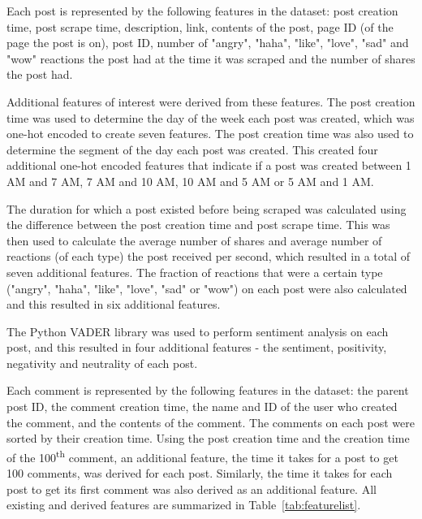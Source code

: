 \documentclass[twoside]{article}
\begin{document}
\begin{multicols}{2}
Each post is represented by the following features in the dataset: post creation time, post scrape time, description, link, contents of the post, page ID (of the page the post is on), post ID, number of "angry", "haha", "like", "love", "sad" and "wow" reactions the post had at the time it was scraped and the number of shares the post had. 

Additional features of interest were derived from these features. The post creation time was used to determine the day of the week each post was created, which was one-hot encoded to create seven features. The post creation time was also used to determine the segment of the day each post was created. This created four additional one-hot encoded features that indicate if a post was created between 1 AM and 7 AM, 7 AM and 10 AM, 10 AM and 5 AM or 5 AM and 1 AM. 

The duration for which a post existed before being scraped was calculated using the difference between the post creation time and post scrape time. This was then used to calculate the average number of shares and average number of reactions (of each type) the post received per second, which resulted in a total of seven additional features. The fraction of reactions that were a certain type ("angry", "haha", "like", "love", "sad" or "wow") on each post were also calculated and this resulted in six additional features. 

The Python VADER library was used to perform sentiment analysis on each post, and this resulted in four additional features - the sentiment, positivity, negativity and neutrality of each post. 

Each comment is represented by the following features in the dataset: the parent post ID, the comment creation time, the name and ID of the user who created the comment, and the contents of the comment. The comments on each post were sorted by their creation time. Using the post creation time and the creation time of the 100\textsuperscript{th} comment,  an additional feature, the time it takes for a post to get 100 comments, was derived for each post. Similarly, the time it takes for each post to get its first comment was also derived as an additional feature. All existing and derived features are summarized in Table~\ref{tab:featurelist}.


\end{multicols}
\end{document}

